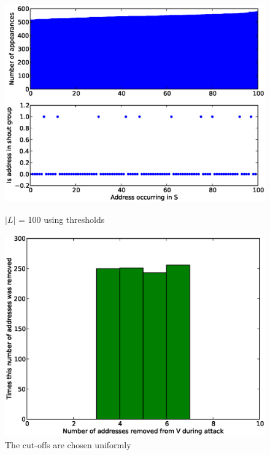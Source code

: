\documentclass[ %
                    author={Luke Murray},
                supervisor={Dr. Simon Hollis},
                     title={Shadow Peer-to-Peer Networks},
                  subtitle={},
                    degree={MEng},
                      year={2013} ]{thesis}
\begin{document}
\begin{figure}[h]%
    \centering
    \begin{minipage}[b]{0.4\linewidth}
        \centering
        \includegraphics[width=\linewidth]{diagrams/threshold_attack_desirable1.eps}
        \caption{$|L|$ = 100 using thresholds}
        \label{threshold_attack1}
    \end{minipage}
    \hspace{0.5cm}
    \begin{minipage}[b]{0.4\linewidth}
        \centering
        \includegraphics[width=\linewidth]{diagrams/threshold_attack_desirable2.eps}
        \caption{The cut-offs are chosen uniformly}
        \label{threshold_attack2}
    \end{minipage}
\end{figure}
\end{document}
